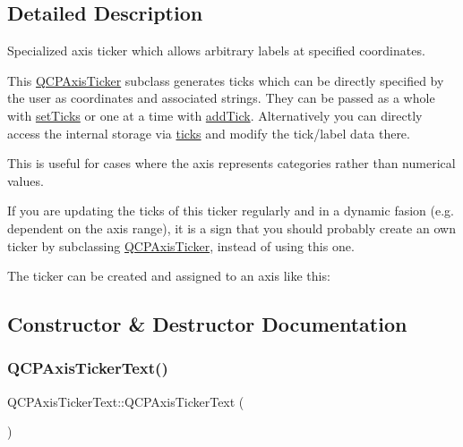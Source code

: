 \subsection{Detailed Description}
Specialized axis ticker which allows arbitrary labels at specified coordinates. 



This \mbox{\hyperlink{class_q_c_p_axis_ticker}{Q\+C\+P\+Axis\+Ticker}} subclass generates ticks which can be directly specified by the user as coordinates and associated strings. They can be passed as a whole with \mbox{\hyperlink{class_q_c_p_axis_ticker_text_a8cdf1f21940f1f53f5e3d30b2c74f5cf}{set\+Ticks}} or one at a time with \mbox{\hyperlink{class_q_c_p_axis_ticker_text_aada3db69e5fc6585aaa4ea5d89552eb0}{add\+Tick}}. Alternatively you can directly access the internal storage via \mbox{\hyperlink{class_q_c_p_axis_ticker_text_ac84622a6bb4f2a98474e185ecaf3189a}{ticks}} and modify the tick/label data there.

This is useful for cases where the axis represents categories rather than numerical values.

If you are updating the ticks of this ticker regularly and in a dynamic fasion (e.\+g. dependent on the axis range), it is a sign that you should probably create an own ticker by subclassing \mbox{\hyperlink{class_q_c_p_axis_ticker}{Q\+C\+P\+Axis\+Ticker}}, instead of using this one.

The ticker can be created and assigned to an axis like this\+: 
\begin{DoxyCodeInclude}{0}
\end{DoxyCodeInclude}


\subsection{Constructor \& Destructor Documentation}
\mbox{\label{class_q_c_p_axis_ticker_text_a1d7243b1256c1aa9d1d5b99b2e84e648}} 
\subsubsection{\texorpdfstring{QCPAxisTickerText()}{QCPAxisTickerText()}}
{\footnotesize\ttfamily Q\+C\+P\+Axis\+Ticker\+Text\+::\+Q\+C\+P\+Axis\+Ticker\+Text (\begin{DoxyParamCaption}{ }\end{DoxyParamCaption})}


